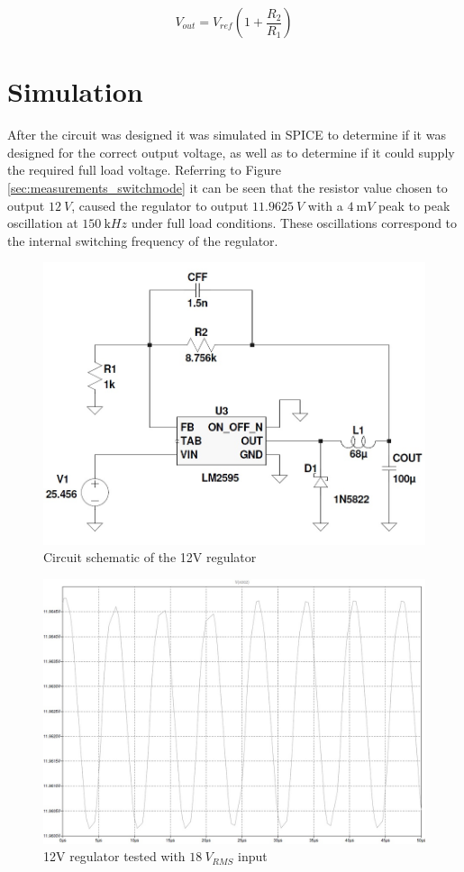 \begin{equation}
   V_{out} = V_{ref}(1+\frac{R_{2}}{R_{1}})
   \label{eq:smpsresistor}
\end{equation} 

\section{Simulation} \label{sec:simulation_switchmode}
After the circuit was designed it was simulated in SPICE to determine if it was designed for the correct output voltage, as well as to determine if it could supply the required full load voltage. Referring to Figure \ref{sec:measurements_switchmode} it can be seen that the resistor value chosen to output $\SI{12}{V}$, caused the regulator to output $\SI{11.9625}{V}$ with a $\SI{4}{\milli V}$ peak to peak oscillation at $\SI{150}{\kilo Hz}$ under full load conditions. These oscillations correspond to the internal switching frequency of the regulator.

\begin{figure}
    \centering
    \includegraphics[width = 0.5\linewidth]{Figures/buckconverter.jpg}
        \caption{Circuit schematic of the 12V regulator}
    \label{fig:buckconvdiagram}
\end{figure}

\begin{figure}
    \centering
    \includegraphics[width = 0.5\linewidth]{Figures/buckconverter12vplot.jpg}
    \caption{12V regulator tested with $\SI{18}{V_{RMS}}$ input}
    \label{fig:buckconvplot}
\end{figure}


